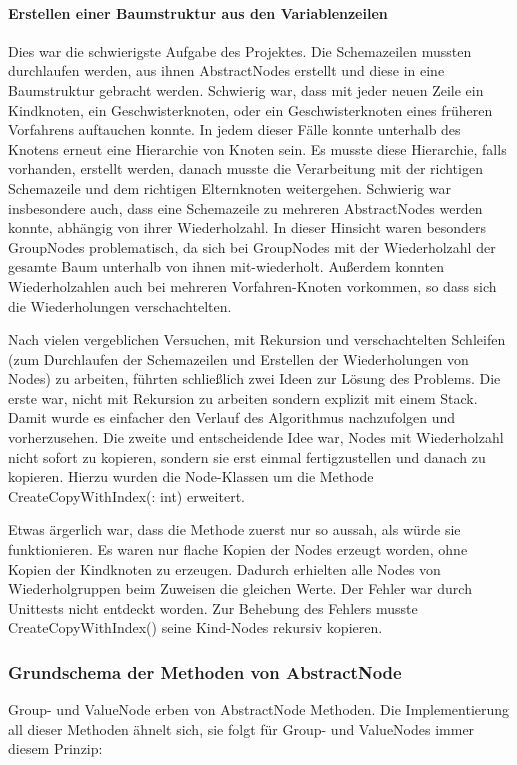 \paragraph{Erstellen einer Baumstruktur aus den Variablenzeilen}
Dies war die schwierigste Aufgabe des Projektes. Die Schemazeilen mussten durchlaufen werden, aus ihnen AbstractNodes erstellt und diese in eine Baumstruktur gebracht werden.
Schwierig war, dass mit jeder neuen  Zeile ein Kindknoten, ein Geschwisterknoten, oder ein Geschwisterknoten eines früheren Vorfahrens auftauchen konnte. In jedem dieser Fälle konnte unterhalb des Knotens erneut eine Hierarchie von Knoten sein. Es musste diese Hierarchie, falls vorhanden, erstellt werden, danach musste die Verarbeitung mit der richtigen Schemazeile und dem richtigen Elternknoten weitergehen.
Schwierig war insbesondere auch, dass eine Schemazeile zu mehreren AbstractNodes werden konnte, abhängig von ihrer Wiederholzahl. In dieser Hinsicht waren besonders GroupNodes problematisch, da sich bei GroupNodes mit der Wiederholzahl der gesamte Baum unterhalb von ihnen mit-wiederholt. Außerdem konnten Wiederholzahlen auch bei mehreren Vorfahren-Knoten vorkommen, so dass sich die Wiederholungen verschachtelten.

Nach vielen vergeblichen Versuchen, mit Rekursion und verschachtelten Schleifen (zum Durchlaufen der Schemazeilen und Erstellen der Wiederholungen von Nodes) zu arbeiten, führten schließlich zwei Ideen zur Lösung des Problems. Die erste war, nicht mit Rekursion zu arbeiten sondern explizit mit einem Stack. Damit wurde es einfacher den Verlauf des Algorithmus  nachzufolgen und vorherzusehen. Die zweite und entscheidende Idee war, Nodes mit Wiederholzahl nicht sofort zu kopieren, sondern sie erst einmal fertigzustellen und danach zu kopieren. Hierzu wurden die Node-Klassen um die Methode CreateCopyWithIndex(: int) erweitert.

Etwas ärgerlich war, dass die Methode zuerst nur so aussah, als würde sie funktionieren. Es waren nur flache Kopien der Nodes erzeugt worden, ohne Kopien der Kindknoten zu erzeugen. Dadurch erhielten alle Nodes von Wiederholgruppen beim Zuweisen die gleichen Werte. Der Fehler war durch Unittests nicht entdeckt worden. Zur Behebung des Fehlers musste CreateCopyWithIndex() seine Kind-Nodes rekursiv kopieren.


\subsubsection{Grundschema der Methoden von AbstractNode}
\label{sec:RekursiveMethoden}
Group- und ValueNode erben von AbstractNode Methoden. Die Implementierung all dieser Methoden ähnelt sich, sie folgt für Group- und ValueNodes immer diesem Prinzip:

